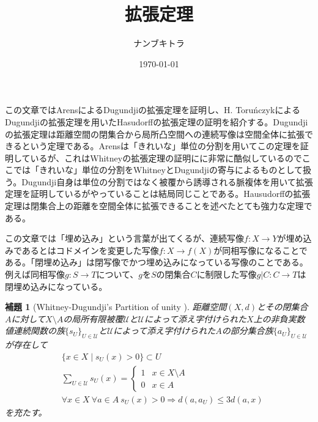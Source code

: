 \documentclass[leqno]{jsarticle}
\title{拡張定理}
\author{ナンブキトラ}
\date{\today}
\newtheorem{lem}[thm]{補題}
\newcommand{\To}{\Longrightarrow}
\begin{document}
\maketitle

この文章ではArens\cite{1}によるDugundjiの拡張定理を証明し、H. Toru\'nczyk\cite{2}によるDugundjiの拡張定理を用いたHasudorffの拡張定理の証明を紹介する。Dugundjiの拡張定理は距離空間の閉集合から局所凸空間への連続写像は空間全体に拡張できるという定理である。Arensは「きれいな」単位の分割を用いてこの定理を証明しているが、これはWhitneyの拡張定理の証明にに非常に酷似しているのでここでは「きれいな」単位の分割をWhitneyとDugundjiの寄与によるものとして扱う。Dugundji自身は単位の分割ではなく被覆から誘導される脈複体を用いて拡張定理を証明しているがやっていることは結局同じことである。Hausudorffの拡張定理は閉集合上の距離を空間全体に拡張できることを述べたとても強力な定理である。\par
この文章では「埋め込み」という言葉が出てくるが、連続写像$f:X\to Y$が埋め込みであるとはコドメインを変更した写像$f:X\to f(X)$が同相写像になることである。「閉埋め込み」は閉写像でかつ埋め込みになっている写像のことである。例えば同相写像$g:S\to T$について、$g$を$S$の閉集合$C$に制限した写像$g|C:C\to T$は閉埋め込みになっている。
\begin{lem}[Whitney-Dugundji's Partition of unity ]
距離空間$(X,d)$とその閉集合$A$に対して$X\setminus A$の局所有限被覆$\mathcal{U}$と$\mathcal{U}$によって添え字付けられた$X$上の非負実数値連続関数の族$\{s_U\}_{U\in \mathcal{U}}$と$\mathcal{U}$によって添え字付けられた$A$の部分集合族$\{a_U\}_{U\in \mathcal{U}}$が存在して
\begin{align}
&\{x\in X\mid s_U(x)>0\}\subset U\\
&\sum_{U\in \mathcal{U}}s_U(x)=
\begin{cases}
		1 & \text{$x\in X\setminus A$}\\
		0 & \text{$x\in A$}
\end{cases}\\
&\forall x\in X\ \forall a\in A\ s_U(x)>0\To d(a,a_U)\le 3d(a,x)
\end{align}
を充たす。
\end{lem}
\end{document}
